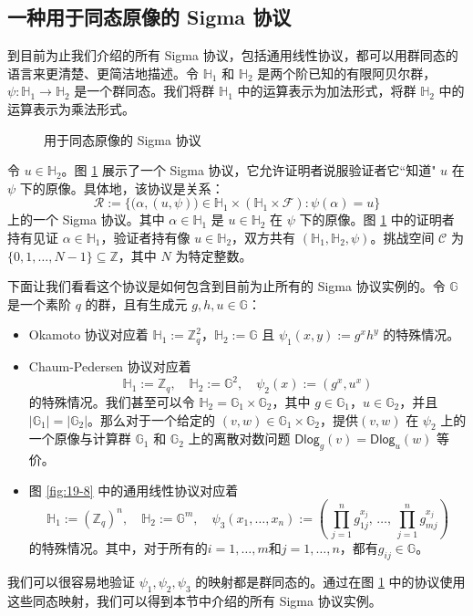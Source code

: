 \subsection{一种用于同态原像的 Sigma 协议}

到目前为止我们介绍的所有 Sigma 协议，包括通用线性协议，都可以用群同态的语言来更清楚、更简洁地描述。令 $\mathbb{H}_1$ 和 $\mathbb{H}_2$ 是两个阶已知的有限阿贝尔群，$\psi:\mathbb{H}_1\to\mathbb{H}_2$ 是一个群同态。我们将群 $\mathbb{H}_1$ 中的运算表示为加法形式，将群 $\mathbb{H}_2$ 中的运算表示为乘法形式。

\begin{figure}
  \centering
  
  \caption{用于同态原像的 Sigma 协议}
  \label{fig:19-9}
\end{figure}

令 $u\in\mathbb{H}_2$。图 \ref{fig:19-9} 展示了一个 Sigma 协议，它允许证明者说服验证者它``知道" $u$ 在 $\psi$ 下的原像。具体地，该协议是关系：
\begin{equation}\label{eq:19-15}
\mathcal{R}:=\bigg\lbrace
\Big(\alpha,(u,\psi)\Big)\in\mathbb{H}_1\times(\mathbb{H}_1\times\mathcal{F}):\psi(\alpha)=u
\bigg\rbrace
\end{equation}
上的一个 Sigma 协议。其中 $\alpha\in\mathbb{H}_1$ 是 $u\in\mathbb{H}_2$ 在 $\psi$ 下的原像。图 \ref{fig:19-9} 中的证明者持有见证 $\alpha\in\mathbb{H}_1$，验证者持有像 $u\in\mathbb{H}_2$，双方共有 $(\mathbb{H}_1,\mathbb{H}_2,\psi)$。挑战空间 $\mathcal{C}$ 为 $\{0,1,\dots,N-1\}\subseteq\mathbb{Z}$，其中 $N$ 为特定整数。

下面让我们看看这个协议是如何包含到目前为止所有的 Sigma 协议实例的。令 $\mathbb{G}$ 是一个素阶 $q$ 的群，且有生成元 $g,h,u\in\mathbb{G}$：
\begin{itemize}
	\item Okamoto 协议对应着 $\mathbb{H}_1:=\mathbb{Z}_q^2$，$\mathbb{H}_2:=\mathbb{G}$ 且 $\psi_1(x,y):=g^xh^y$ 的特殊情况。
	\item Chaum-Pedersen 协议对应着
	\[
	\mathbb{H}_1:=\mathbb{Z}_q,
	\quad
	\mathbb{H}_2:=\mathbb{G}^2,
	\quad
	\psi_2(x):=(g^x,u^x)
	\]
	的特殊情况。我们甚至可以令 $\mathbb{H}_2=\mathbb{G}_1\times\mathbb{G}_2$，其中 $g\in\mathbb{G}_1$，$u\in\mathbb{G}_2$，并且 $|\mathbb{G}_1|=|\mathbb{G}_2|$。那么对于一个给定的 $(v,w)\in\mathbb{G}_1\times\mathbb{G}_2$，提供$(v, w)$ 在 $\psi_2$ 上的一个原像与计算群 $\mathbb{G}_1$ 和 $\mathbb{G}_2$ 上的离散对数问题 $\mathsf{Dlog}_g(v)=\mathsf{Dlog}_u(w)$ 等价。
	\item 图 \ref{fig:19-8} 中的通用线性协议对应着
	\[
    \mathbb{H}_1:=(\mathbb{Z}_q)^n,
    \quad
    \mathbb{H}_2:=\mathbb{G}^m,
    \quad
    \psi_3(x_1,\dots,x_n):=
    \left(\,\prod_{j=1}^ng_{1j}^{x_j},\,\dots,\,\prod_{j=1}^ng_{mj}^{x_j}\right)
    \]
    的特殊情况。其中，对于所有的$i=1,\dots,m$和$j=1,\dots,n$，都有$g_{ij}\in\mathbb{G}$。
\end{itemize}
我们可以很容易地验证 $\psi_1,\psi_2,\psi_3$ 的映射都是群同态的。通过在图 \ref{fig:19-9} 中的协议使用这些同态映射，我们可以得到本节中介绍的所有 Sigma 协议实例。

